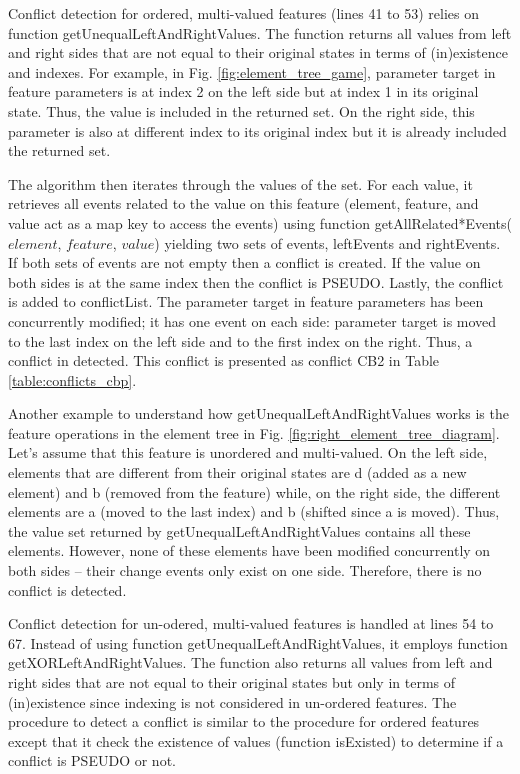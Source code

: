 Conflict detection for ordered, multi-valued features (lines 41 to 53) relies on function \textsf{getUnequalLeftAndRightValues}. The function returns all values from left and right sides that are not equal to their original states in terms of (in)existence and indexes. For example, in Fig. \ref{fig:element_tree_game}, parameter \textsf{target} in feature \textsf{parameters} is at index 2 on the left side but at index 1 in its original state. Thus, the value is included in the returned set. On the right side, this parameter is also at different index to its original index but it is already included the returned set. 

The algorithm then iterates through the values of the set. For each value, it retrieves all events related to the value on this feature (element, feature, and value act as a map key to access the events) using function \textsf{getAllRelated*Events($element$, $feature$, $value$)} yielding two sets of events, \textsf{leftEvents} and \textsf{rightEvents}. If both sets of events are not empty then a conflict is created. If the value on both sides is at the same index then the conflict is \textsf{PSEUDO}. Lastly, the conflict is added to \textsf{conflictList}. The parameter \textsf{target} in feature \textsf{parameters} has been concurrently modified; it has one event on each side: parameter \textsf{target} is moved to the last index on the left side and to the first index on the right. Thus, a conflict in detected. This conflict is presented as conflict \textsf{CB2} in Table \ref{table:conflicts_cbp}.

Another example to understand how \textsf{getUnequalLeftAndRightValues} works is the feature \textsf{operations} in the element tree in Fig. \ref{fig:right_element_tree_diagram}. Let's assume that this feature is unordered and multi-valued. On the left side, elements that are different from their original states are \textsf{d} (added as a new element) and \textsf{b} (removed from the feature) while, on the right side, the different elements are \textsf{a} (moved to the last index) and \textsf{b} (shifted since \textsf{a} is moved). Thus, the value set returned by \textsf{getUnequalLeftAndRightValues} contains all these elements. However, none of these elements have been modified concurrently on both sides -- their change events only exist on one side. Therefore, there is no conflict is detected. 

Conflict detection for un-odered, multi-valued features is handled at lines 54 to 67. Instead of using function \textsf{getUnequalLeftAndRightValues}, it employs function \textsf{getXORLeftAndRightValues}. The function also returns all values from left and right sides that are not equal to their original states but only in terms of (in)existence since indexing is not considered in un-ordered features. The procedure to detect a conflict is similar to the procedure for ordered features except that it check the existence of values (function \textsf{isExisted}) to determine if a conflict is \textsf{PSEUDO} or not.

